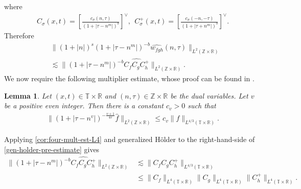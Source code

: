 \documentclass[12pt,reqno]{amsart}
\numberwithin{equation}{section}  %
\numberwithin{figure}{section}
\newcommand{\rr}{\mathbb{R}}
\newcommand{\zz}{\mathbb{Z}}
\newcommand{\ci}{\mathbb{T}}
\newcommand{\wh}{\widehat}
\theoremstyle{plain}
\newtheorem{lemma}{Lemma}
\theoremstyle{definition}
\theoremstyle{remark}
\begin{document}
%
%
where
%
%
\begin{equation*}
	\begin{split}
		C_\sigma(x, t) = \left[ \frac{c_\sigma\left( n, \tau \right)}{\left( 
		1 + | \tau - n^{m } | \right)^{b}} \right]^\vee,
		\ \ C^+_\sigma(x, t) = \left[ \frac{c_\sigma\left( -n, -\tau \right)}{\left( 
		1 + | \tau + n^{m } | \right)^{b}} \right]^\vee.
	\end{split}
\end{equation*}
%
%
Therefore
%
%
\begin{equation}
	\label{gen-holder-pre-estimate}
	\begin{split}
		& \| \left( 1 + |n | \right)^s
		\left( 1 + | \tau - n^{m } | \right)^{-b} \wh{w_{fgh}}(n, 
		\tau)		
		\|_{L^2(\zz \times \rr)}
		\\
		& \lesssim \| \left( 1 + | \tau - n^{m } | \right)^{-b}
		\wh{C_f C_{g} C^+_{h}} \|_{L^2(\zz \times \rr)}.
	\end{split}
\end{equation}
%
We now require the following multiplier estimate, whose proof can be found in 
\cite{Himonas-Misiolek-2001-A-priori-estimates-for-Schrodinger}.
%
%
%
%
%
%
%
%
%
%
%
%
%
%
\begin{lemma}
	\label{lem:four-mult-est-L4}
	Let $(x, t) \in \ci \times \rr $ and $(n, \tau) \in \zz \times \rr$ be 
	the dual variables. Let $v$ be a positive even integer. Then there is a 
	constant $c_v > 0$ such that
%
%
\begin{equation}
	\label{four-mult-est-L4*}
	\begin{split}
		\| \left( 1 + | \tau - n^v | 
		\right)^{-\frac{v+1}{4v}}
		\wh{f}\|_{L^2(\zz \times \rr)} \le c_v \|f \|_{L^{4/3}( \ci \times \rr)}.
	\end{split}
\end{equation}
%
%
\end{lemma}
%
%
Applying \autoref{cor:four-mult-est-L4} and generalized H\"{o}lder to the 
right-hand-side of \eqref{gen-holder-pre-estimate} gives
%
%
\begin{equation}
	\label{gen-holder-piece-1}
	\begin{split}
		\|\left( 1 + | \tau - n^{m } | \right)^{-b} \wh{C_f C_{ 
		g } C^+_{h}}\|_{L^2(\zz \times \rr)}
		& \lesssim  \|C_f C_{g} C^+_{h} \|_{L^{4/3}(\ci \times \rr)}
		\\
		& \le \|C_f \|_{L^4(\ci \times \rr)} \|C_{g}\|_{L^4(\ci \times \rr)} 
		\|C^+_{h}\|_{L^4(\ci \times \rr)}.
	\end{split}
\end{equation}
\end{document}
